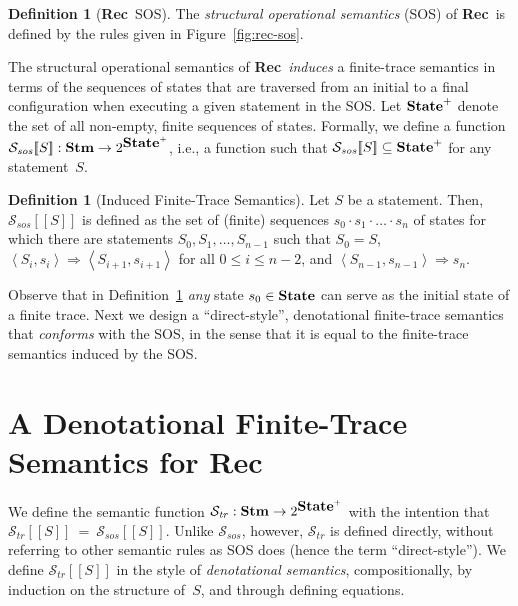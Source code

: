 \documentclass[10pt,a4paper]{amsart}
\theoremstyle{definition}
\newtheorem{definition}[theorem]{Definition}
\newcommand{\rh}[1]{\marginpar{RH: #1}}
\newcommand{\SOSTrans}[2]{#1 \Rightarrow #2}
\newcommand{\config}[2]{\left< #1, #2 \right>}
\newcommand{\SOSConfTrans}[4]{\SOSTrans{\config{#1}{#2}}{\config{#3}{#4}}}
\newcommand{\SOSConfFinTrans}[3]{\SOSTrans{\config{#1}{#2}}{#3}}
\newcommand{\denot}[1]{\left[\!\left[#1\right]\!\right]}
\newcommand{\trcdenot}[1]{\mathcal{S}_{\mathit{tr}}\!\denot{#1}}
\newcommand{\sosdenot}[1]{\mathcal{S}_{\mathit{sos}}\!\denot{#1}}
\newcommand{\WHILE}{\mbox{\bf While}}
\newcommand{\Rec}{\mbox{\bf Rec}}
\newcommand{\Stm}{\mbox{\bf Stm}}
\newcommand{\State}{\mbox{\bf State}}
\begin{document}
\begin{definition}[\Rec\ SOS]
  \label{def:rec-sos}
  The \emph{structural operational semantics} (SOS) of \Rec\ is
  defined by the rules given in Figure~\ref{fig:rec-sos}.
\end{definition}


The structural operational semantics of \Rec\ \emph{induces} a
finite-trace semantics in terms of the sequences of states that are
traversed from an initial to a final configuration when executing a
given statement in the SOS.
%
Let $\State^+$ denote the set of all non-empty, finite sequences of
states. Formally, we define a function
$\sosdenot{S} : \Stm \rightarrow 2^{\State^+}$, i.e., a function
such that $\sosdenot{S} \subseteq \State^+$ for any statement~$S$.

\begin{definition}[Induced Finite-Trace Semantics]
  \label{def:induced-finite-trace-semantics}
  Let $S$ be a statement. Then, $\sosdenot{S}$ is defined as the set
  of (finite) sequences $s_0 \cdot s_1 \cdot \ldots \cdot s_n$ of
  states for which there are statements $S_0, S_1, \ldots, S_{n-1}$
  such that $S_0 = S$, $\SOSConfTrans{S_i}{s_i}{S_{i+1}}{s_{i+1}}$ for
  all $0 \leq i \leq n-2$, and
  $\SOSConfFinTrans{S_{n-1}}{s_{n-1}}{s_n}$.
\end{definition}
% 
Observe that in Definition~\ref{def:induced-finite-trace-semantics}
\emph{any} state $s_0 \in \State$ can serve as the initial state of a
finite trace.
%
Next we design a ``direct-style'', denotational finite-trace semantics
that \emph{conforms} with the SOS, in the sense that it is equal to the
finite-trace semantics induced by the SOS.


\section{A Denotational Finite-Trace Semantics for \Rec}
\label{sec:rec-traces}

We define the semantic function
$\mathcal{S}_{\mathit{tr}} : \Stm \rightarrow 2^{\State^+}$ with the
intention that $ \trcdenot{S} \>=\> \sosdenot{S} $.
%
Unlike $\mathcal{S}_{sos}$, however, $\mathcal{S}_{\mathit{tr}}$ is
defined directly, without referring to other semantic rules as SOS
does (hence the term ``direct-style'').
%
%
We  define $\trcdenot{S}$ in the style of \emph{denotational 
semantics}, compositionally, by induction on the structure of~$S$, 
and through defining equations.
\end{document}
